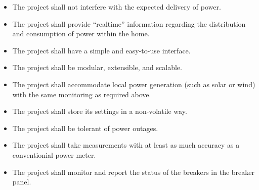 \begin{itemize}
 \item The project shall not interfere with the expected delivery of power.
 \item The project shall provide ``realtime'' information regarding the distribution and consumption of power within the home.
 \item The project shall have a simple and easy-to-use interface.
 \item The project shall be modular, extensible, and scalable.
 \item The project shall accommodate local power generation (such as solar or wind) with the same monitoring as required above.
 \item The project shall store its settings in a non-volatile way.
 \item The project shall be tolerant of power outages.
 \item The project shall take measurements with at least as much accuracy as a conventionial power meter.
 \item The project shall monitor and report the status of the breakers in the breaker panel.
\end{itemize}